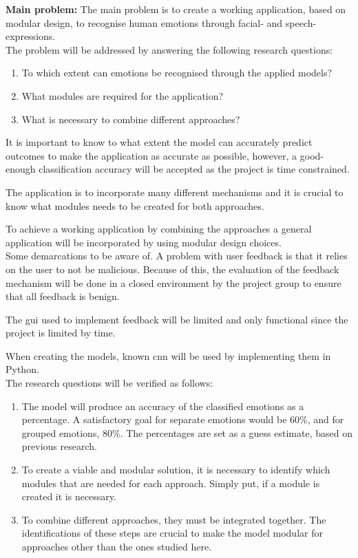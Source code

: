 \noindent\textbf{Main problem:}
The main problem is to create a working application, based on modular design, to recognise human emotions through facial- and speech-expressions. \\


\noindent The problem will be addressed by answering the following research questions:
\begin{enumerate}

\item To which extent can emotions be recognised through the applied models? 

\item What modules are required for the application? 

\item What is necessary to combine different approaches?

\end{enumerate}

\noindent It is important to know to what extent the model can accurately predict outcomes to make the application as accurate as possible, however, a good-enough classification accuracy will be accepted as the project is time constrained.

\noindent The application is to incorporate many different mechanisms and  it is crucial to know what modules needs to be created for both approaches.

\noindent To achieve a working application by combining the approaches a general application will be incorporated by using modular design choices.
\\
\noindent Some demarcations to be aware of. A problem with user feedback is that it relies on the user to not be malicious. Because of this, the evaluation of the feedback mechanism will be done in a closed environment by the project group to ensure that all feedback is benign.

\noindent The \acrlong{gui} used to implement feedback will be limited and only functional since the project is limited by time.


\noindent When creating the models, known \acrshort{cnn} will be used by implementing them in Python. \\


\noindent The research questions will be verified as follows:

\begin{enumerate}

    \item The model will produce an accuracy of the classified emotions as a percentage. A satisfactory goal  for separate emotions would be 60\%, and for grouped emotions, 80\%. The percentages are set as a guess estimate, based on previous research.\cite{pramerdorfer2016facial}
    \item To create a viable and modular solution, it is necessary to identify which modules that are needed for each approach. Simply put, if a module is created it is necessary.
    \item To combine different approaches, they must be integrated together. The identifications of these steps are crucial to make the model modular for approaches other than the ones studied here. 
\end{enumerate}
